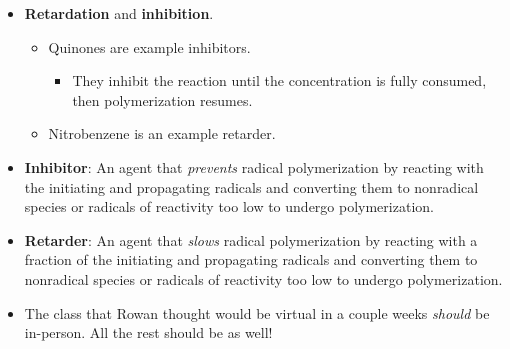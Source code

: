 \documentclass[../notes.tex]{subfiles}
\begin{document}
\begin{itemize}
\begin{itemize}
    \end{itemize}
    \item \textbf{Retardation} and \textbf{inhibition}.
    \begin{itemize}
        \item Quinones are example inhibitors.
        \begin{itemize}
            \item They inhibit the reaction until the concentration is fully consumed, then polymerization resumes.
        \end{itemize}
        \item Nitrobenzene is an example retarder.
    \end{itemize}
    \item \textbf{Inhibitor}: An agent that \emph{prevents} radical polymerization by reacting with the initiating and propagating radicals and converting them to nonradical species or radicals of reactivity too low to undergo polymerization.
    \item \textbf{Retarder}: An agent that \emph{slows} radical polymerization by reacting with a fraction of the initiating and propagating radicals and converting them to nonradical species or radicals of reactivity too low to undergo polymerization.
    \item The class that Rowan thought would be virtual in a couple weeks \emph{should} be in-person. All the rest should be as well!
\end{itemize}
\end{document}
